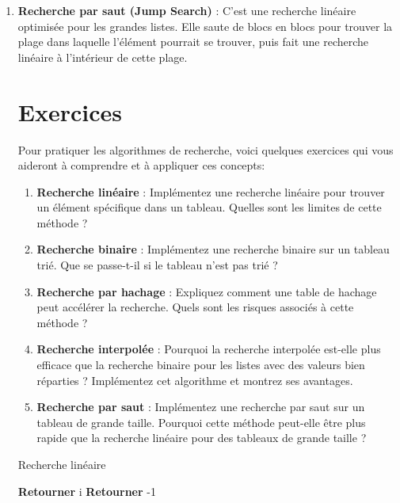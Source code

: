 \begin{enumerate}
	
	
	\item \textbf{Recherche par saut (Jump Search)} : C'est une recherche linéaire optimisée pour les grandes listes. Elle saute de blocs en blocs pour trouver la plage dans laquelle l'élément pourrait se trouver, puis fait une recherche linéaire à l'intérieur de cette plage.
	


\section{Exercices}

Pour pratiquer les algorithmes de recherche, voici quelques exercices qui vous aideront à comprendre et à appliquer ces concepts:

\begin{enumerate}
	\item \textbf{Recherche linéaire} : Implémentez une recherche linéaire pour trouver un élément spécifique dans un tableau. Quelles sont les limites de cette méthode ?
	\item \textbf{Recherche binaire} : Implémentez une recherche binaire sur un tableau trié. Que se passe-t-il si le tableau n'est pas trié ?
	\item \textbf{Recherche par hachage} : Expliquez comment une table de hachage peut accélérer la recherche. Quels sont les risques associés à cette méthode ?
	\item \textbf{Recherche interpolée} : Pourquoi la recherche interpolée est-elle plus efficace que la recherche binaire pour les listes avec des valeurs bien réparties ? Implémentez cet algorithme et montrez ses avantages.
	\item \textbf{Recherche par saut} : Implémentez une recherche par saut sur un tableau de grande taille. Pourquoi cette méthode peut-elle être plus rapide que la recherche linéaire pour des tableaux de grande taille ?
\end{enumerate}


	\begin{algorithm}
	\caption{Recherche linéaire}
	\begin{algorithmic}[1]
		\State \textbf{Retourner} i
		\EndIf
		\EndFor
		\State \textbf{Retourner} -1
	\end{algorithmic}
\end{algorithm}


\end{enumerate}
